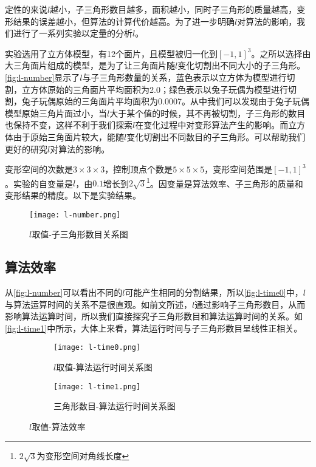 定性的来说$l$越小，子三角形数目越多，面积越小，同时子三角形的质量越高，变形结果的误差越小，但算法的计算代价越高。为了进一步明确$l$对算法的影响，我们进行了一系列实验以定量的分析$l$。

实验选用了立方体模型，有12个面片，且模型被归一化到$[-1, 1]^3$。之所以选择由大三角面片组成的模型，是为了让三角面片随$l$变化切割出不同大小的子三角形。\autoref{fig:l-number}显示了$l$与子三角形数量的关系，蓝色表示以立方体为模型进行切割，立方体原始的三角面片平均面积为2.0；绿色表示以兔子玩偶为模型进行切割，兔子玩偶原始的三角面片平均面积为0.0007。从中我们可以发现由于兔子玩偶模型原始三角片面过小，当$l$大于某个值的时候，其不再被切割，子三角形的数目也保持不变，这样不利于我们探索$l$在变化过程中对变形算法产生的影响。而立方体由于原始三角面片较大，能随$l$变化切割出不同数目的子三角形。可以帮助我们更好的研究$l$对算法的影响。

变形空间的次数是$3\times3\times3$，控制顶点个数是$5\times5\times5$，变形空间范围是$[-1, 1]^3$。实验的自变量是$l$，由$0.1$增长到$2\sqrt{3}$\footnote{$2\sqrt{3}$为变形空间对角线长度}。因变量是算法效率、子三角形的质量和变形结果的精度。以下是实验结果。

\begin{figure}[htbp]
	\centering
	\texttt{[image: l-number.png]}
	\caption{$l$取值-子三角形数目关系图}\label{fig:l-number}
\end{figure}

\subsection{算法效率}
从\autoref{fig:l-number}可以看出不同的$l$可能产生相同的分割结果，所以\autoref{fig:l-time0}中，$l$与算法运算时间的关系不是很直观。如前文所述，$l$通过影响子三角形数目，从而影响算法运算时间，所以我们直接探究子三角形数目和算法运算时间的关系。如\autoref{fig:l-time1}中所示，大体上来看，算法运行时间与子三角形数目呈线性正相关。

\begin{figure}[htbp]
	\centering
	\begin{subfigure}[b]{.45\textwidth}
	    \centering
	    \texttt{[image: l-time0.png]}
	    \caption{$l$取值-算法运行时间关系图}\label{fig:l-time0}
	\end{subfigure}
	\begin{subfigure}[b]{.45\textwidth}
	    \centering
	    \texttt{[image: l-time1.png]}
	    \caption{三角形数目-算法运行时间关系图}\label{fig:l-time1}
	\end{subfigure}
	\caption{$l$取值-算法效率}\label{fig:l-time}
\end{figure}

